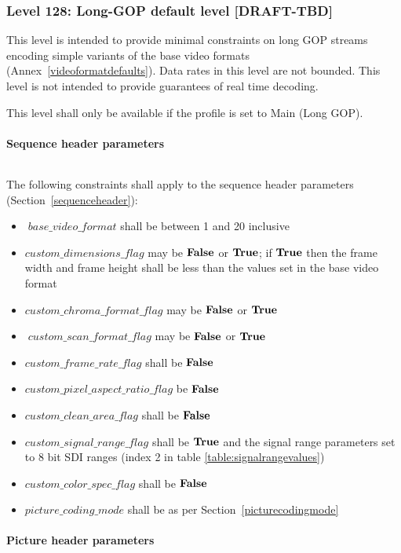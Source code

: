 \subsubsection{Level 128: Long-GOP default level [DRAFT-TBD]}

This level is intended to provide minimal constraints on long GOP
streams encoding simple variants of the base video formats 
(Annex~\ref{videoformatdefaults}).
Data rates in this level are not bounded. This level is not intended to provide
guarantees of real time decoding.

This level shall only be available if the profile is set to Main (Long GOP).

\paragraph{Sequence header parameters}$\ $\newline

The following constraints shall apply to the sequence header parameters
(Section~\ref{sequenceheader}):
\begin{itemize}
\item$base\_video\_format$ shall be between 1 and 20 inclusive
\item $custom\_dimensions\_flag$ may be $\text{\bf{False}}$ or $\text{\bf{True}}$; if $\text{\bf{True}}$ then
the frame width and frame height shall be less than the values set in the
base video format
\item $custom\_chroma\_format\_flag$ may be $\text{\bf{False}}$ or $\text{\bf{True}}$
\item$custom\_scan\_format\_flag$ may be $\text{\bf{False}}$ or $\text{\bf{True}}$
\item $custom\_frame\_rate\_flag$ shall be $\text{\bf{False}}$
\item $custom\_pixel\_aspect\_ratio\_flag$ be $\text{\bf{False}}$
\item $custom\_clean\_area\_flag$ shall be $\text{\bf{False}}$
\item $custom\_signal\_range\_flag$ shall be $\text{\bf{True}}$ and the signal range 
parameters set to 8 bit SDI ranges (index 2 in table \ref{table:signalrangevalues})
\item $custom\_color\_spec\_flag$ shall be $\text{\bf{False}}$
\item $picture\_coding\_mode$ shall be as per Section~\ref{picturecodingmode}
\end{itemize}

\paragraph{Picture header parameters}$\ $\newline

